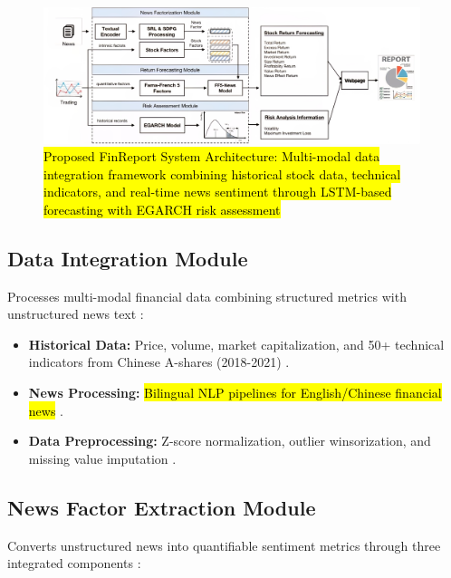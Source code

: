 \documentclass[3p,times,procedia]{elsarticle}
\begin{document}
\begin{figure}[!ht]
    \centering
    \includegraphics[width=0.98\textwidth]{flowchart.jpg}
    \caption{\hl{Proposed FinReport System Architecture: Multi-modal data integration framework combining historical stock data, technical indicators, and real-time news sentiment through LSTM-based forecasting with EGARCH risk assessment}}
    \label{fig:workflow_diagram}
\end{figure}

\subsection{{Data Integration Module}}
\vspace{-2pt}
Processes multi-modal financial data combining structured metrics with unstructured news text \cite{Harvey2016}:
\begin{itemize}\setlength{\itemsep}{0pt}
\item \textbf{Historical Data:} Price, volume, market capitalization, and 50+ technical indicators from Chinese A-shares (2018-2021) \cite{FinReportDataset2025}.
\item \textbf{News Processing:} \hl{Bilingual NLP pipelines for English/Chinese financial news} \cite{Loughran2011}.
\item \textbf{Data Preprocessing:} Z-score normalization, outlier winsorization, and missing value imputation \cite{Fischer2018}.
\end{itemize}

\subsection{{News Factor Extraction Module}}
\vspace{-2pt}
Converts unstructured news into quantifiable sentiment metrics through three integrated components \cite{TETLOCK2007}:
\end{document}
